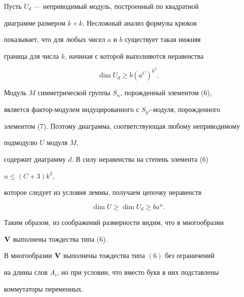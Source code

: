 \begin{pf}


Пусть $U_d$ --- неприводимый модуль, построенный по квадратной


диаграмме размером $k\times k$. Несложный анализ формулы крюков


показывает, что для любых чисел $a$ и $b$ существует такая нижняя


граница для числа $k$, начиная с которой выполняются неравенства


$$


\dim U_d\ge b(a^C)^{k^2}.


$$





Модуль $M$ симметрической группы $S_n$, порожденный элементом (6),


является фактор-модулем индуцированного с $S_{k^2}$-модуля, порожденного


элементом (7). Поэтому диаграмма, соответствующая любому неприводимому


подмодулю $U$ модуля $M$,


содержит диаграмму $d$. В силу неравенства на степень элемента (6)


$n\le(C+3)k^2$,


которое следует из условия леммы, получаем цепочку неравенств


$$


\dim U\ge\dim U_d\ge b a^n.


$$





Таким образом, из соображений размерности видим, что в многообразии


$\bold V$ выполнены тождества типа (6).


\end{pf}





\begin{lem}


В многообразии $\bold V$ выполнены тождества типа $(6)$ без ограничений


на длины слов $A_i$, но при условии, что вместо букв в них подставлены


коммутаторы переменных.


\end{lem}





